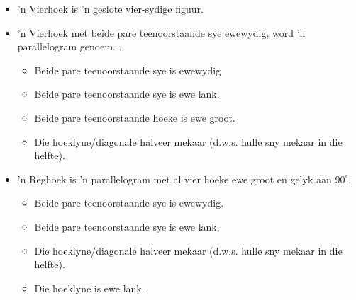 \begin{itemize}[noitemsep]
\item ’n Vierhoek is ’n geslote vier-sydige figuur.
\item ’n Vierhoek met beide pare teenoorstaande sye ewewydig, word ’n parallelogram genoem. .
\begin{itemize}
\item Beide pare teenoorstaande sye is ewewydig
\item Beide pare teenoorstaande sye is ewe lank.
\item Beide pare teenoorstaande hoeke is ewe groot.
\item Die hoeklyne/diagonale halveer mekaar (d.w.s. hulle sny mekaar in die helfte).
\end{itemize}
\item ’n Reghoek is ’n parallelogram met al vier hoeke ewe groot en gelyk aan $90^\circ$.
\begin{itemize}
\item Beide pare teenoorstaande sye is ewewydig.
\item Beide pare teenoorstaande sye is ewe lank.
\item Die hoeklyne/diagonale halveer mekaar (d.w.s. hulle sny mekaar in die helfte).
\item Die hoeklyne is ewe lank.


\end{itemize}
\end{itemize}
